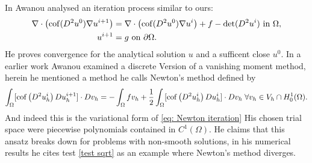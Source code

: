 In \cite{Awanou2014} Awanou analysed an iteration process similar to ours:
\begin{align}
	\nabla \cdot \left( \operatorname{cof}(D^2 u^0) \nabla u^{i+1} \right) &= \nabla \cdot \left( \operatorname{cof}(D^2 u^0) \nabla u^{i} \right) + f - \operatorname{det} (D^2u^i) \textnormal{ in } \Omega,  \label{eq: Awanout eq}\\
	u^{i+1} &= g \textnormal{ on } \partial \Omega.
\end{align}
He proves convergence for the analytical solution $u$ and a sufficent close $u^0$. 
In a earlier work \cite{Awanou2010} Awanou examined a discrete Version of a vanishing moment method, herein he mentioned a method he calls Newton's method defined by
\[
	\int_{\Omega} [\operatorname{cof} \left(  D^2 u_h^i \right) Du_h^{i+1}] \cdot Dv_h = -	\int_{\Omega} f v_h + \frac 1 2 \int_{\Omega} [\operatorname{cof} \left(  D^2 u_h^i \right) Du_h^{i}] \cdot Dv_h \; \forall v_h \in V_h \cap H^1_0 (\Omega)  \label{eq: Awanout eq2}.
\]
And indeed this is the variational form of \eqref{eq: Newton iteration}
His chosen trial space were piecewise polynomials contained in $C^1(\Omega)$. He claims that this ansatz breaks down for problems with non-smooth solutions, in his numerical results he cites test \ref{test sqrt} as an example where Newton's method diverges.


